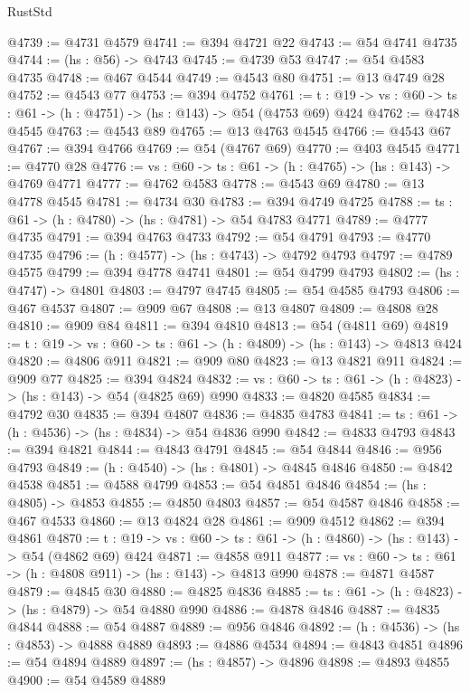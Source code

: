 \begin{lexlean}{RustStd}
\begin{coremodule}
{\begin{coremodule}
{{{{{{{{@4739 := @4731 @4579
@4741 := @394 @4721 @22
@4743 := @54 @4741 @4735
@4744 := (hs : @56) -> @4743
@4745 := @4739 @53
@4747 := @54 @4583 @4735
@4748 := @467 @4544
@4749 := @4543 @80
@4751 := @13 @4749 @28
@4752 := @4543 @77
@4753 := @394 @4752
@4761 := {t : @19} -> {vs : @60} -> {ts : @61} -> (h : @4751) -> (hs : @143) -> @54 (@4753 @69) @424
@4762 := @4748 @4545
@4763 := @4543 @89
@4765 := @13 @4763 @4545
@4766 := @4543 @67
@4767 := @394 @4766
@4769 := @54 (@4767 @69)
@4770 := @403 @4545
@4771 := @4770 @28
@4776 := {vs : @60} -> {ts : @61} -> (h : @4765) -> (hs : @143) -> @4769 @4771
@4777 := @4762 @4583
@4778 := @4543 @69
@4780 := @13 @4778 @4545
@4781 := @4734 @30
@4783 := @394 @4749 @4725
@4788 := {ts : @61} -> (h : @4780) -> (hs : @4781) -> @54 @4783 @4771
@4789 := @4777 @4735
@4791 := @394 @4763 @4733
@4792 := @54 @4791
@4793 := @4770 @4735
@4796 := (h : @4577) -> (hs : @4743) -> @4792 @4793
@4797 := @4789 @4575
@4799 := @394 @4778 @4741
@4801 := @54 @4799 @4793
@4802 := (hs : @4747) -> @4801
@4803 := @4797 @4745
@4805 := @54 @4585 @4793
@4806 := @467 @4537
@4807 := @909 @67
@4808 := @13 @4807
@4809 := @4808 @28
@4810 := @909 @84
@4811 := @394 @4810
@4813 := @54 (@4811 @69)
@4819 := {t : @19} -> {vs : @60} -> {ts : @61} -> (h : @4809) -> (hs : @143) -> @4813 @424
@4820 := @4806 @911
@4821 := @909 @80
@4823 := @13 @4821 @911
@4824 := @909 @77
@4825 := @394 @4824
@4832 := {vs : @60} -> {ts : @61} -> (h : @4823) -> (hs : @143) -> @54 (@4825 @69) @990
@4833 := @4820 @4585
@4834 := @4792 @30
@4835 := @394 @4807
@4836 := @4835 @4783
@4841 := {ts : @61} -> (h : @4536) -> (hs : @4834) -> @54 @4836 @990
@4842 := @4833 @4793
@4843 := @394 @4821
@4844 := @4843 @4791
@4845 := @54 @4844
@4846 := @956 @4793
@4849 := (h : @4540) -> (hs : @4801) -> @4845 @4846
@4850 := @4842 @4538
@4851 := @4588 @4799
@4853 := @54 @4851 @4846
@4854 := (hs : @4805) -> @4853
@4855 := @4850 @4803
@4857 := @54 @4587 @4846
@4858 := @467 @4533
@4860 := @13 @4824 @28
@4861 := @909 @4512
@4862 := @394 @4861
@4870 := {t : @19} -> {vs : @60} -> {ts : @61} -> (h : @4860) -> (hs : @143) -> @54 (@4862 @69) @424
@4871 := @4858 @911
@4877 := {vs : @60} -> {ts : @61} -> (h : @4808 @911) -> (hs : @143) -> @4813 @990
@4878 := @4871 @4587
@4879 := @4845 @30
@4880 := @4825 @4836
@4885 := {ts : @61} -> (h : @4823) -> (hs : @4879) -> @54 @4880 @990
@4886 := @4878 @4846
@4887 := @4835 @4844
@4888 := @54 @4887
@4889 := @956 @4846
@4892 := (h : @4536) -> (hs : @4853) -> @4888 @4889
@4893 := @4886 @4534
@4894 := @4843 @4851
@4896 := @54 @4894 @4889
@4897 := (hs : @4857) -> @4896
@4898 := @4893 @4855
@4900 := @54 @4589 @4889
}}}}}}}}
\end{coremodule}}
\end{coremodule}
\end{lexlean}
